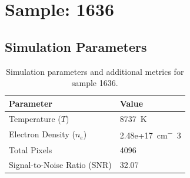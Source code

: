 \documentclass[a4paper,11pt]{article}
\begin{document}
\clearpage

\section{Sample: 1636}
\subsection{Simulation Parameters}
\begin{table}[h!]
    \centering
    \begin{tabular}{ll}
        \toprule
        \textbf{Parameter} & \textbf{Value} \\
        \midrule
        Temperature ($T$) & 8737 \,\si{K} \\
        Electron Density ($n_e$) & 2.48e+17 \,\si{cm^-3} \\
        Total Pixels & 4096 \\
        Signal-to-Noise Ratio (SNR) & 32.07 \\
        \bottomrule
    \end{tabular}
    \caption{Simulation parameters and additional metrics for sample 1636.}
    \label{tab:params_1636}
\end{table}
\end{document}
